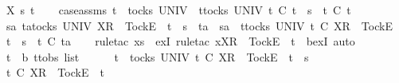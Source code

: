 \begin{isabellebody}
\ X\ s\ t\isanewline
\ \ \isamarkupfalse%
\ case{\isacharunderscore}assms{\isacharcolon}\ {\isachardoublequoteopen}t\ {\isasymin}\ tocks\ UNIV{\isachardoublequoteclose}\ {\isachardoublequoteopen}\ {\isasymforall}t{\isacharprime}{\isasymin}tocks\ UNIV{\isachardot}\ t{\isacharprime}\ {\isasymle}\isactrlsub C\ t\ {\isacharat}\ s\ {\isasymlongrightarrow}\ t{\isacharprime}\ {\isasymle}\isactrlsub C\ t{\isachardoublequoteclose}\isanewline
\ \ \isamarkupfalse%
\ \isamarkupfalse%
\ {\isachardoublequoteopen}{\isasymexists}sa{\isachardot}\ {\isasymexists}ta{\isasymin}tocks\ UNIV{\isachardot}\ {\isacharbrackleft}X{\isacharbrackright}\isactrlsub R\ {\isacharhash}\ {\isacharbrackleft}Tock{\isacharbrackright}\isactrlsub E\ {\isacharhash}\ t\ {\isacharat}\ s\ {\isacharequal}\ ta\ {\isacharat}\ sa\ {\isasymand}\ {\isacharparenleft}{\isasymforall}t{\isacharprime}{\isasymin}tocks\ UNIV{\isachardot}\ t{\isacharprime}\ {\isasymle}\isactrlsub C\ {\isacharbrackleft}X{\isacharbrackright}\isactrlsub R\ {\isacharhash}\ {\isacharbrackleft}Tock{\isacharbrackright}\isactrlsub E\ {\isacharhash}\ t\ {\isacharat}\ s\ {\isasymlongrightarrow}\ t{\isacharprime}\ {\isasymle}\isactrlsub C\ ta{\isacharparenright}{\isachardoublequoteclose}\isanewline
\ \ \isamarkupfalse%
\ {\isacharparenleft}rule{\isacharunderscore}tac\ x{\isacharequal}{\isachardoublequoteopen}s{\isachardoublequoteclose}\ \ exI{\isacharcomma}\ rule{\isacharunderscore}tac\ x{\isacharequal}{\isachardoublequoteopen}{\isacharbrackleft}X{\isacharbrackright}\isactrlsub R\ {\isacharhash}\ {\isacharbrackleft}Tock{\isacharbrackright}\isactrlsub E\ {\isacharhash}\ t{\isachardoublequoteclose}\ \ bexI{\isacharcomma}\ auto{\isacharparenright}\isanewline
\ \ \ \ \isamarkupfalse%
\ t{\isacharprime}\ {\isacharcolon}{\isacharcolon}\ {\isachardoublequoteopen}{\isacharprime}b\ ttobs\ list{\isachardoublequoteclose}\isanewline
\ \ \ \ \isamarkupfalse%
\ {\isachardoublequoteopen}t{\isacharprime}\ {\isasymin}\ tocks\ UNIV{\isachardoublequoteclose}\ {\isachardoublequoteopen}t{\isacharprime}\ {\isasymle}\isactrlsub C\ {\isacharbrackleft}X{\isacharbrackright}\isactrlsub R\ {\isacharhash}\ {\isacharbrackleft}Tock{\isacharbrackright}\isactrlsub E\ {\isacharhash}\ t\ {\isacharat}\ s{\isachardoublequoteclose}\isanewline
\ \ \ \ \isamarkupfalse%
\ \isamarkupfalse%
\ {\isachardoublequoteopen}t{\isacharprime}\ {\isasymle}\isactrlsub C\ {\isacharbrackleft}X{\isacharbrackright}\isactrlsub R\ {\isacharhash}\ {\isacharbrackleft}Tock{\isacharbrackright}\isactrlsub E\ {\isacharhash}\ t{\isachardoublequoteclose}\isanewline

\end{isabellebody}
